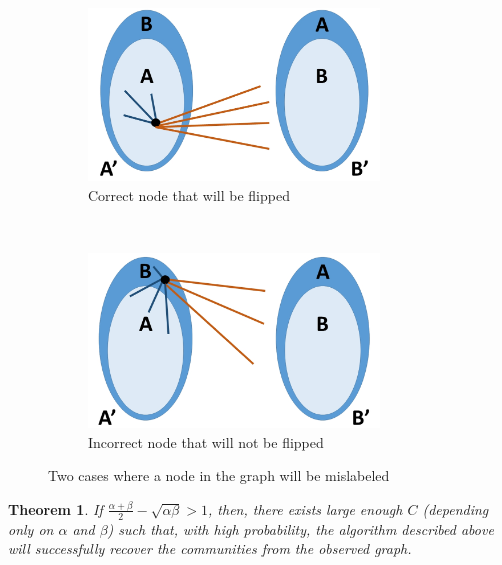 \documentclass[english]{article}
\newtheorem{theorem}{Theorem}
\newcommand{\1}{\textbf{1}}
\begin{document}
\begin{figure}
        \centering
        \begin{subfigure}[b]{0.33\textwidth}
                \includegraphics[width=0.85\textwidth]{CorrectFlip.jpg}
                \caption{Correct node that will be flipped}
                \label{fig:Correctl}
        \end{subfigure}%
\qquad
        ~ %
        \begin{subfigure}[b]{0.33\textwidth}
                \includegraphics[width=0.85\textwidth]{IncorrectNoFlip.jpg}
                \caption{Incorrect node that will not be flipped}
                \label{fig:Incorrect}
        \end{subfigure}
        \caption{Two cases where a node in the graph will be mislabeled}\label{fig:Failures}
\end{figure}

\begin{theorem}
If $\frac{\alpha+\beta}{2}-\sqrt{\alpha \beta}>1$, then, there exists large enough $C$ (depending only on $\alpha$ and $\beta$) such that, with high probability, the algorithm described above will successfully recover the communities from the observed graph.
\end{theorem}
\end{document}
